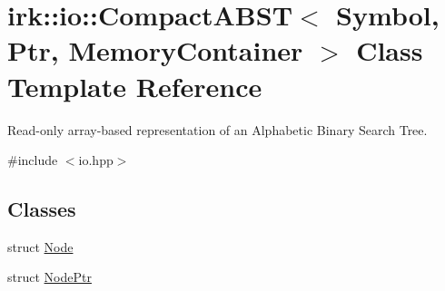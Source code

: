 \hypertarget{classirk_1_1io_1_1CompactABST}{}\section{irk\+:\+:io\+:\+:Compact\+A\+B\+ST$<$ Symbol, Ptr, Memory\+Container $>$ Class Template Reference}
\label{classirk_1_1io_1_1CompactABST}


Read-\/only array-\/based representation of an Alphabetic Binary Search Tree.  




{\ttfamily \#include $<$io.\+hpp$>$}

\subsection*{Classes}
\begin{DoxyCompactItemize}
\item 
struct \mbox{\hyperlink{structirk_1_1io_1_1CompactABST_1_1Node}{Node}}
\item 
struct \mbox{\hyperlink{structirk_1_1io_1_1CompactABST_1_1NodePtr}{Node\+Ptr}}
\end{DoxyCompactItemize}
